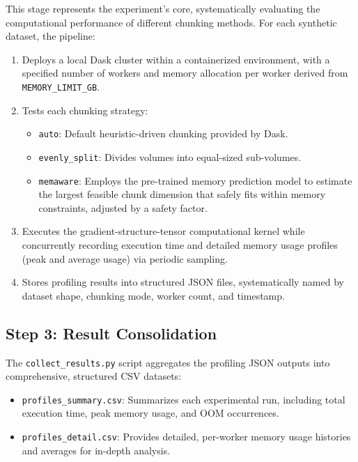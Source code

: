 This stage represents the experiment’s core, systematically evaluating the computational performance of different chunking methods.
For each synthetic dataset, the pipeline:

\begin{enumerate}
    \item Deploys a local Dask cluster within a containerized environment, with a specified number of workers and memory allocation per worker derived from \texttt{MEMORY\_LIMIT\_GB}.
    \item Tests each chunking strategy:\begin{itemize}
                                           \item \texttt{auto}: Default heuristic-driven chunking provided by Dask.
                                           \item \texttt{evenly\_split}: Divides volumes into equal-sized sub-volumes.
                                           \item \texttt{memaware}: Employs the pre-trained memory prediction model to estimate the largest feasible chunk dimension that safely fits within memory constraints, adjusted by a safety factor.
    \end{itemize}
    \item Executes the gradient-structure-tensor computational kernel while concurrently recording execution time and detailed memory usage profiles (peak and average usage) via periodic sampling.
    \item Stores profiling results into structured JSON files, systematically named by dataset shape, chunking mode, worker count, and timestamp.
\end{enumerate}

\subsection*{Step 3: Result Consolidation}

The \texttt{collect\_results.py} script aggregates the profiling JSON outputs into comprehensive, structured CSV datasets:

\begin{itemize}
    \item \texttt{profiles\_summary.csv}: Summarizes each experimental run, including total execution time, peak memory usage, and \ac{OOM} occurrences.
    \item \texttt{profiles\_detail.csv}: Provides detailed, per-worker memory usage histories and averages for in-depth analysis.
\end{itemize}


